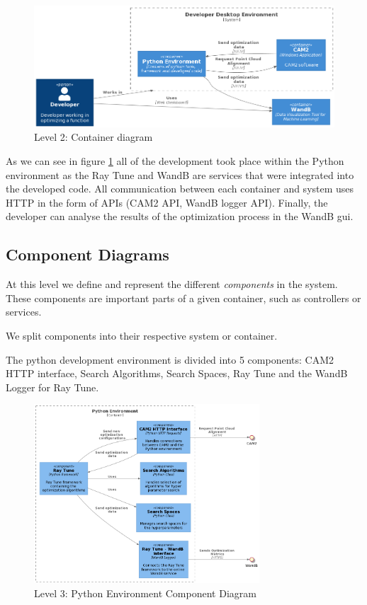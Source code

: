 \begin{figure}[h]
\centering
\includegraphics[width=\textwidth, keepaspectratio]{images/c2_new.png}
\caption{Level 2: Container diagram}
\label{fig:level2}
\end{figure}

As we can see in figure \ref{fig:level2} all of the development took place within the Python environment as the Ray Tune and WandB are services that were integrated into the developed code. All communication between each container and system uses HTTP in the form of APIs (CAM2 API, WandB logger API). Finally, the developer can analyse the results of the optimization process in the WandB \acrfull{gui}.

\subsection{Component Diagrams}

At this level we define and represent the different \textit{components} in the system. These components are important parts of a given container, such as controllers or services. 

We split components into their respective system or container.

The \acrshort{python} development environment is divided into 5 components: CAM2 HTTP interface, Search Algorithms, Search Spaces, Ray Tune and the WandB Logger for Ray Tune.


\begin{figure}[H]
\centering
\includegraphics[width=0.75\textwidth]{images/c3_python.png}
\caption{Level 3: Python Environment Component Diagram}
\label{fig:l3_python}
\end{figure}

